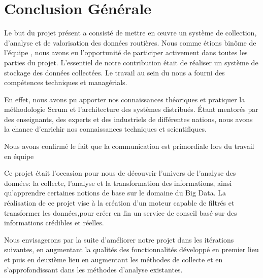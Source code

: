 \chapter*{Conclusion Générale}


Le but du projet présent a consisté de mettre en \oe{}uvre un système de
collection, d'analyse et de valorisation des données routières. Nous comme
étions binôme de l'équipe , nous avons eu l'opportunité
de participer activement dans toutes les parties du projet. L'essentiel de
notre contribution était de réaliser un système de stockage des données
collectées. Le travail au sein du  nous a fourni des
compétences techniques et managérials.

En effet, nous avons pu apporter nos connaissances théoriques et pratiquer la
méthodologie Scrum et l'architecture des systèmes distribués. Étant mentorés
par des enseignants, des experts et des industriels de différentes nations,
nous avons la chance d'enrichir nos connaissances techniques et scientifiques.

Nous avons confirmé le fait que la communication est primordiale lors du travail en équipe

%

Ce projet était l’occasion pour nous de découvrir l’univers de l'analyse des
données: la collecte, l'analyse et la transformation des informations, ainsi
qu’apprendre certaines notions de base sur le domaine du Big Data.  La
réalisation de ce  projet vise à la création d'un moteur capable de filtrés et
transformer les données,pour créer en fin un service de conseil basé sur des
informations crédibles et réelles.

Nous envisagerons par la suite d’améliorer notre projet dans les itérations
suivantes, en augmentant la qualités des fonctionnalités développé en premier
lieu et puis en deuxième lieu en augmentant les méthodes de collecte et en
s'approfondissant dans les méthodes d'analyse existantes.